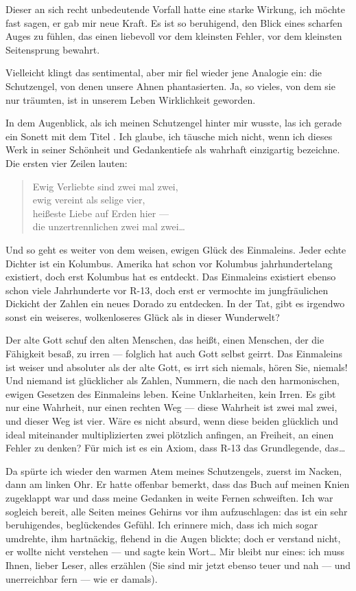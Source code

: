 Dieser an sich recht unbedeutende Vorfall hatte
eine starke Wirkung, ich möchte fast sagen, er gab mir neue Kraft.
Es ist so beruhigend, den Blick eines scharfen Auges zu fühlen, das
einen liebevoll vor dem kleinsten Fehler, vor dem kleinsten
Seitensprung bewahrt.

Vielleicht klingt das sentimental, aber mir
fiel wieder jene Analogie ein: die Schutzengel, von denen unsere
Ahnen phantasierten. Ja, so vieles, von dem sie nur träumten, ist
in unserem Leben Wirklichkeit geworden.

In dem Augenblick, als ich
meinen Schutzengel hinter mir wusste, las ich gerade ein Sonett mit
dem Titel . Ich glaube, ich täusche mich nicht, wenn ich
dieses Werk in seiner Schönheit und Gedankentiefe als wahrhaft
einzigartig bezeichne. Die ersten vier Zeilen lauten:

\begin{verse}
Ewig Verliebte sind zwei mal zwei,\\
ewig vereint als selige vier,\\
heißeste Liebe auf Erden hier —\\
die unzertrennlichen zwei mal zwei\ldots{}
\end{verse}

Und so geht es weiter von dem weisen, ewigen Glück des Einmaleins.
Jeder echte Dichter ist ein Kolumbus. Amerika hat schon vor
Kolumbus jahrhundertelang existiert, doch erst Kolumbus hat es
entdeckt. Das Einmaleins existiert ebenso schon viele Jahrhunderte
vor R-13, doch erst er vermochte im jungfräulichen Dickicht der
Zahlen ein neues Dorado zu entdecken. In der Tat, gibt es irgendwo
sonst ein weiseres, wolkenloseres Glück als in dieser Wunderwelt?

Der alte Gott schuf den alten Menschen, das heißt, einen Menschen,
der die Fähigkeit besaß, zu irren — folglich hat auch Gott selbst
geirrt. Das Einmaleins ist weiser und absoluter als der alte Gott,
es irrt sich niemals, hören Sie, niemals! Und niemand ist
glücklicher als Zahlen, Nummern, die nach den harmonischen, ewigen
Gesetzen des Einmaleins leben. Keine Unklarheiten, kein Irren. Es
gibt nur eine Wahrheit, nur einen rechten Weg — diese Wahrheit ist
zwei mal zwei, und dieser Weg ist vier. Wäre es nicht absurd, wenn
diese beiden glücklich und ideal miteinander multiplizierten zwei
plötzlich anfingen, an Freiheit, an einen Fehler zu denken? Für
mich ist es ein Axiom, dass R-13 das Grundlegende, das\ldots{}

Da spürte
ich wieder den warmen Atem meines Schutzengels, zuerst im Nacken,
dann am linken Ohr. Er hatte offenbar bemerkt, dass das Buch auf
meinen Knien zugeklappt war und dass meine Gedanken in weite Fernen
schweiften. Ich war sogleich bereit, alle Seiten meines Gehirns vor
ihm aufzuschlagen: das ist ein sehr beruhigendes, beglückendes
Gefühl. Ich erinnere mich, dass ich mich sogar umdrehte, ihm
hartnäckig, flehend in die Augen blickte; doch er verstand nicht,
er wollte nicht verstehen — und sagte kein Wort\ldots{} Mir bleibt nur
eines: ich muss Ihnen, lieber Leser, alles erzählen (Sie sind mir
jetzt ebenso teuer und nah — und unerreichbar fern — wie er
damals).

